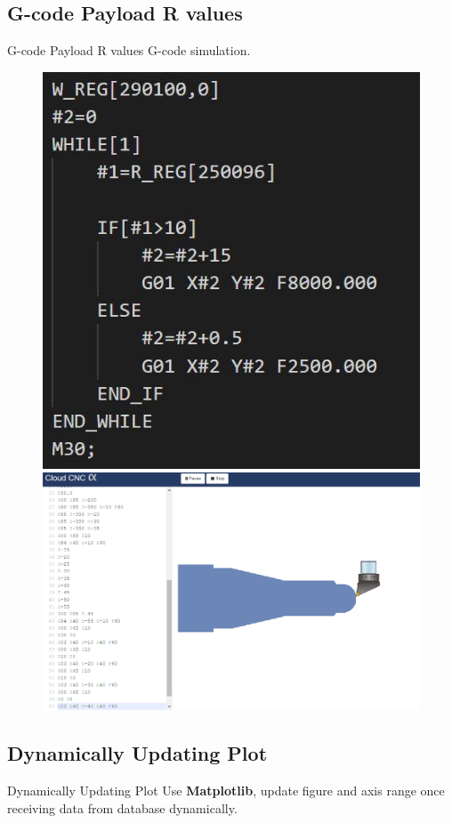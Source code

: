 \documentclass[11pt]{beamer}
\begin{document}
\subsection{G-code Payload R values}
\begin{frame}{G-code Payload R values}
  G-code simulation.
    \begin{figure}
      \centering
      \includegraphics[scale=0.22]{g1.jpg}
      \includegraphics[scale=0.15]{actual.png}
    \end{figure}
  \end{frame}

\subsection{Dynamically Updating Plot}
\begin{frame}{Dynamically Updating Plot}
  Use \textbf{Matplotlib}, update figure and axis range once receiving data from database dynamically.
\end{frame}
\end{document}
